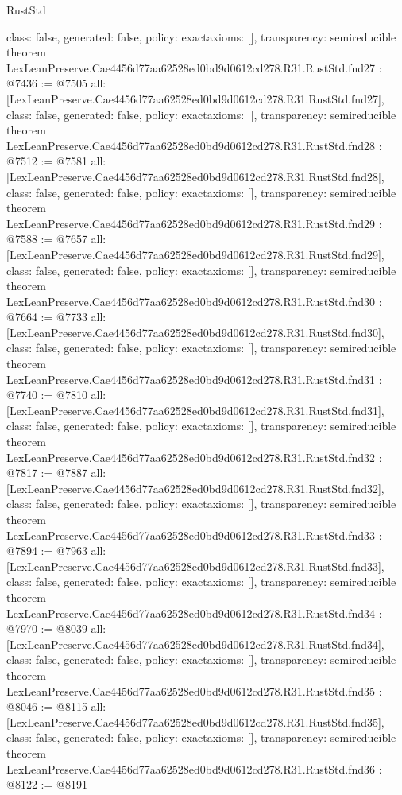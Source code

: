 \begin{lexlean}{RustStd}
\begin{coremodule}
{  class: false,
  generated: false,
  policy: exact{axioms: []},
  transparency: semireducible
}
theorem LexLeanPreserve.Cae4456d77aa62528ed0bd9d0612cd278.R31.RustStd.fnd27 : @7436 := @7505 {
  all: [LexLeanPreserve.Cae4456d77aa62528ed0bd9d0612cd278.R31.RustStd.fnd27],
  class: false,
  generated: false,
  policy: exact{axioms: []},
  transparency: semireducible
}
theorem LexLeanPreserve.Cae4456d77aa62528ed0bd9d0612cd278.R31.RustStd.fnd28 : @7512 := @7581 {
  all: [LexLeanPreserve.Cae4456d77aa62528ed0bd9d0612cd278.R31.RustStd.fnd28],
  class: false,
  generated: false,
  policy: exact{axioms: []},
  transparency: semireducible
}
theorem LexLeanPreserve.Cae4456d77aa62528ed0bd9d0612cd278.R31.RustStd.fnd29 : @7588 := @7657 {
  all: [LexLeanPreserve.Cae4456d77aa62528ed0bd9d0612cd278.R31.RustStd.fnd29],
  class: false,
  generated: false,
  policy: exact{axioms: []},
  transparency: semireducible
}
theorem LexLeanPreserve.Cae4456d77aa62528ed0bd9d0612cd278.R31.RustStd.fnd30 : @7664 := @7733 {
  all: [LexLeanPreserve.Cae4456d77aa62528ed0bd9d0612cd278.R31.RustStd.fnd30],
  class: false,
  generated: false,
  policy: exact{axioms: []},
  transparency: semireducible
}
theorem LexLeanPreserve.Cae4456d77aa62528ed0bd9d0612cd278.R31.RustStd.fnd31 : @7740 := @7810 {
  all: [LexLeanPreserve.Cae4456d77aa62528ed0bd9d0612cd278.R31.RustStd.fnd31],
  class: false,
  generated: false,
  policy: exact{axioms: []},
  transparency: semireducible
}
theorem LexLeanPreserve.Cae4456d77aa62528ed0bd9d0612cd278.R31.RustStd.fnd32 : @7817 := @7887 {
  all: [LexLeanPreserve.Cae4456d77aa62528ed0bd9d0612cd278.R31.RustStd.fnd32],
  class: false,
  generated: false,
  policy: exact{axioms: []},
  transparency: semireducible
}
theorem LexLeanPreserve.Cae4456d77aa62528ed0bd9d0612cd278.R31.RustStd.fnd33 : @7894 := @7963 {
  all: [LexLeanPreserve.Cae4456d77aa62528ed0bd9d0612cd278.R31.RustStd.fnd33],
  class: false,
  generated: false,
  policy: exact{axioms: []},
  transparency: semireducible
}
theorem LexLeanPreserve.Cae4456d77aa62528ed0bd9d0612cd278.R31.RustStd.fnd34 : @7970 := @8039 {
  all: [LexLeanPreserve.Cae4456d77aa62528ed0bd9d0612cd278.R31.RustStd.fnd34],
  class: false,
  generated: false,
  policy: exact{axioms: []},
  transparency: semireducible
}
theorem LexLeanPreserve.Cae4456d77aa62528ed0bd9d0612cd278.R31.RustStd.fnd35 : @8046 := @8115 {
  all: [LexLeanPreserve.Cae4456d77aa62528ed0bd9d0612cd278.R31.RustStd.fnd35],
  class: false,
  generated: false,
  policy: exact{axioms: []},
  transparency: semireducible
}
theorem LexLeanPreserve.Cae4456d77aa62528ed0bd9d0612cd278.R31.RustStd.fnd36 : @8122 := @8191 {
}
\end{coremodule}
\end{lexlean}
